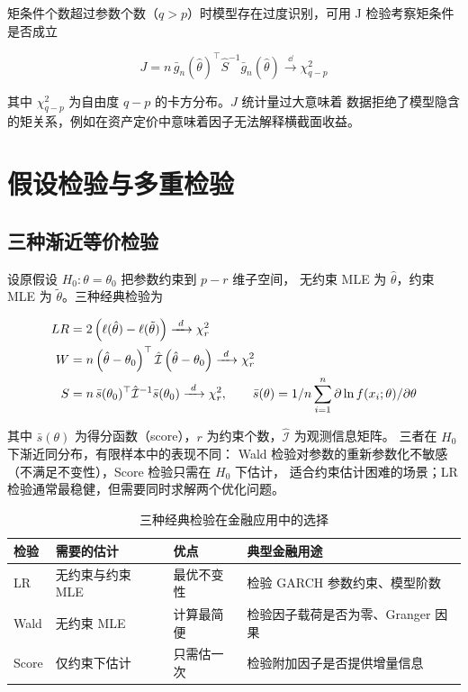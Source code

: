 矩条件个数超过参数个数（$q > p$）时模型存在过度识别，可用 J 检验考察矩条件是否成立

\begin{equation}
  J = n\,\bar{g}_n(\hat{\theta})^{\top}\hat{S}^{-1}\bar{g}_n(\hat{\theta})
  \xrightarrow{\ \dd\ } \chi^{2}_{q-p}
  \label{eq:08-jtest}
\end{equation}

其中 $\chi^{2}_{q-p}$ 为自由度 $q-p$ 的卡方分布。$J$ 统计量过大意味着
数据拒绝了模型隐含的矩关系，例如在资产定价中意味着因子无法解释横截面收益。

\section{假设检验与多重检验}

\subsection{三种渐近等价检验}

设原假设 $H_0: \theta = \theta_0$ 把参数约束到 $p - r$ 维子空间，
无约束 MLE 为 $\hat{\theta}$，约束 MLE 为 $\tilde{\theta}$。三种经典检验为

\begin{align}
  LR &= 2\left(\ell(\hat{\theta}) - \ell(\tilde{\theta})\right)
     \xrightarrow{\ d\ } \chi^{2}_{r}
     \label{eq:08-lrt} \\
  W  &= n\left(\hat{\theta} - \theta_0\right)^{\top}\hat{\mathcal{I}}\left(\hat{\theta} - \theta_0\right)
     \xrightarrow{\ d\ } \chi^{2}_{r}
     \label{eq:08-wald} \\
  S  &= n\,\bar{s}(\theta_0)^{\top}\hat{\mathcal{I}}^{-1}\bar{s}(\theta_0)
     \xrightarrow{\ d\ } \chi^{2}_{r},
     \qquad \bar{s}(\theta) = 1/n\sum_{i=1}^{n}\partial \ln f(x_i;\theta)/\partial \theta
     \label{eq:08-score}
\end{align}

其中 $\bar{s}(\theta)$ 为得分函数（score），$r$ 为约束个数，$\hat{\mathcal{I}}$ 为观测信息矩阵。
三者在 $H_0$ 下渐近同分布，有限样本中的表现不同：
Wald 检验对参数的重新参数化不敏感（不满足不变性），Score 检验只需在 $H_0$ 下估计，
适合约束估计困难的场景；LR 检验通常最稳健，但需要同时求解两个优化问题。

\begin{table}[htbp]
\centering
\caption{三种经典检验在金融应用中的选择}\label{tab:08-tests}
\tablefont
\begin{tabular}{@{}lllL{4.4cm}@{}}
\toprule
检验 & 需要的估计 & 优点 & 典型金融用途 \\
\midrule
LR & 无约束与约束 MLE & 最优不变性 & 检验 GARCH 参数约束、模型阶数 \\
Wald & 无约束 MLE & 计算最简便 & 检验因子载荷是否为零、Granger 因果 \\
Score & 仅约束下估计 & 只需估一次 & 检验附加因子是否提供增量信息 \\
\bottomrule
\end{tabular}
\end{table}

